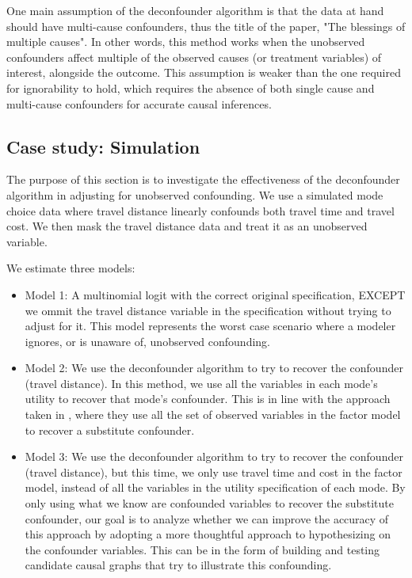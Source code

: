 One main assumption of the deconfounder algorithm is that the data at hand 
should have multi-cause confounders, thus the title of the paper, "The 
blessings of multiple causes". In other words, this method works when the 
unobserved confounders affect multiple of the observed causes (or treatment 
variables) of interest, alongside the outcome. This assumption is weaker than 
the one required for ignorability to hold, which requires the absence of both 
single cause and multi-cause confounders for accurate causal inferences. 



\subsection{Case study: Simulation}
\label{sec:deconfounder-simulation}

The purpose of this section is to investigate the effectiveness of the 
deconfounder algorithm \citep{wang_2019_blessings} in adjusting for unobserved 
confounding. We use a simulated mode choice data where travel distance 
linearly confounds both travel time and travel cost. We then mask the travel 
distance data and treat it as an unobserved variable. 


We estimate three models:

\begin{itemize}
	\item Model 1: A multinomial logit with the correct original specification, 
	EXCEPT we ommit the travel distance variable in the specification without 
	trying to adjust for it. This model represents the worst case scenario 
	where a modeler ignores, or is unaware of, unobserved confounding.
	\item Model 2: We use the deconfounder algorithm to try to recover the 
	confounder (travel distance). In this method, we use all the variables in 
	each mode's utility to recover that mode's confounder. This is in line 
	with the approach taken in \citet{wang_2019_blessings}, where they use all the set 
	of observed variables in the factor model to recover a substitute 
	confounder.
	\item Model 3: We use the deconfounder algorithm to try to recover the 
	confounder (travel distance), but this time, we only use travel time and 
	cost in the factor model, instead of all the variables in the utility 
	specification of each mode. By only using what we know are confounded 
	variables to recover the substitute confounder, our goal is to analyze 
	whether we can improve the accuracy of this approach by adopting a more 
	thoughtful approach to hypothesizing on the confounder variables. This can 
	be in the form of building and testing candidate causal graphs that 
	try to illustrate this confounding. 
\end{itemize}


